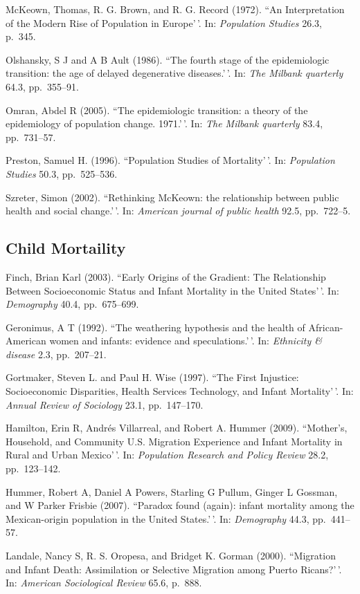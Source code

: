 \documentclass[11pt,]{article}
\begin{document}
McKeown, Thomas, R. G. Brown, and R. G. Record (1972). ``An
Interpretation of the Modern Rise of Population in Europe'\,'. In:
\emph{Population Studies} 26.3, p.~345.

Olshansky, S J and A B Ault (1986). ``The fourth stage of the
epidemiologic transition: the age of delayed degenerative diseases.'\,'.
In: \emph{The Milbank quarterly} 64.3, pp.~355--91.

Omran, Abdel R (2005). ``The epidemiologic transition: a theory of the
epidemiology of population change. 1971.'\,'. In:
\emph{The Milbank quarterly} 83.4, pp.~731--57.

Preston, Samuel H. (1996). ``Population Studies of Mortality'\,'. In:
\emph{Population Studies} 50.3, pp.~525--536.

Szreter, Simon (2002). ``Rethinking McKeown: the relationship between
public health and social change.'\,'. In:
\emph{American journal of public health} 92.5, pp.~722--5.

\hypertarget{child-mortaility}{%
\subsection{Child Mortaility}\label{child-mortaility}}

Finch, Brian Karl (2003). ``Early Origins of the Gradient: The
Relationship Between Socioeconomic Status and Infant Mortality in the
United States'\,'. In: \emph{Demography} 40.4, pp.~675--699.

Geronimus, A T (1992). ``The weathering hypothesis and the health of
African-American women and infants: evidence and speculations.'\,'. In:
\emph{Ethnicity \& disease} 2.3, pp.~207--21.

Gortmaker, Steven L. and Paul H. Wise (1997). ``The First Injustice:
Socioeconomic Disparities, Health Services Technology, and Infant
Mortality'\,'. In: \emph{Annual Review of Sociology} 23.1, pp.~147--170.

Hamilton, Erin R, Andrés Villarreal, and Robert A. Hummer (2009).
``Mother's, Household, and Community U.S. Migration Experience and
Infant Mortality in Rural and Urban Mexico'\,'. In:
\emph{Population Research and Policy Review} 28.2, pp.~123--142.

Hummer, Robert A, Daniel A Powers, Starling G Pullum, Ginger L Gossman,
and W Parker Frisbie (2007). ``Paradox found (again): infant mortality
among the Mexican-origin population in the United States.'\,'. In:
\emph{Demography} 44.3, pp.~441--57.

Landale, Nancy S, R. S. Oropesa, and Bridget K. Gorman (2000).
``Migration and Infant Death: Assimilation or Selective Migration among
Puerto Ricans?'\,'. In: \emph{American Sociological Review} 65.6,
p.~888.
\end{document}
